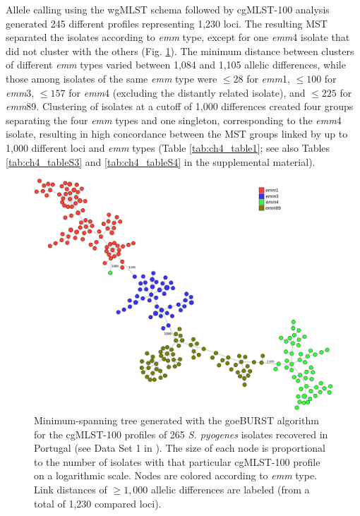 Allele calling using the \ac{wgMLST} schema followed by cgMLST-100 analysis generated 245 different profiles representing 1,230 loci. The resulting \ac{MST} separated the isolates according to \textit{emm} type, except for one \textit{emm}4 isolate that did not cluster with the others (Fig. \ref{fig:chap4_figure1}). The minimum distance between clusters of different \textit{emm} types varied between 1,084 and 1,105 allelic differences, while those among isolates of the same \textit{emm} type were $\leq28$ for \textit{emm}1, $\leq100$ for \textit{emm}3, $\leq157$ for \textit{emm}4 (excluding the distantly related isolate), and $\leq225$ for \textit{emm}89. Clustering of isolates at a cutoff of 1,000 differences created four groups separating the four \textit{emm} types and one singleton, corresponding to the \textit{emm}4 isolate, resulting in high concordance between the \ac{MST} groups linked by up to 1,000 different loci and \textit{emm} types (Table \ref{tab:ch4_table1}; see also Tables \ref{tab:ch4_tableS3} and \ref{tab:ch4_tableS4} in the supplemental material).

\begin{figure}[!ht]
    \centering
    \includegraphics[width=\textwidth]{figures/chapter 4/Figure1.pdf}
    \caption[Minimum-spanning tree generated with the goeBURST algorithm for the cgMLST-100 profiles of 265 \textit{S. pyogenes} isolates recovered in Portugal.]{Minimum-spanning tree generated with the goeBURST algorithm for the cgMLST-100 profiles of 265 \textit{S. pyogenes} isolates recovered in Portugal (see Data Set 1 in \cite{friaes_supplemental_2023}). The size of each node is proportional to the number of isolates with that particular cgMLST-100 profile on a logarithmic scale. Nodes are colored according to \textit{emm} type. Link distances of $\geq1,000$ allelic differences are labeled (from a total of 1,230 compared loci).}
    \label{fig:chap4_figure1}
\end{figure}

